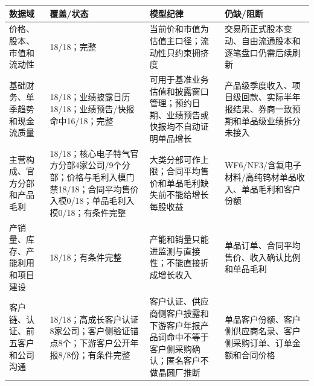 \begin{exhibitbox}
\scriptsize
\begin{tabularx}{\exhibitboxwidth}{L{2.1cm} L{1.8cm} X X}
\toprule
\textbf{数据域} & \textbf{覆盖/状态} & \textbf{模型纪律} & \textbf{仍缺/阻断} \\
\midrule
价格、股本、市值和流动性 & 18/18；完整 & 当前价和市值为估值主口径；流动性只约束拥挤度 & 交易所正式股本变动、自由流通股本和逐笔盘口仍需后续刷新 \\
基础财务、单季趋势和现金流质量 & 18/18；业绩披露日历18/18；业绩预告/快报命中16/18；完整 & 可用于基准业务估值和披露窗口管理；预约日期、业绩预告或快报均不自动证明单品增长 & 产品级季度收入、项目级回款、实际半年报结果、券商一致预期和单品级业绩拆分未接入 \\
主营构成、官方分部和产品毛利 & 18/18；核心电子特气官方分部4家公司/9个分部；价格与毛利入模门禁18/18；合同平均售价入模0/18；单品毛利入模0/18；有条件完整 & 大类分部可作上限；合同平均售价和单品毛利缺失前不能给增长每股收益 & WF6/NF3/含氟电子材料/高纯钨材单品收入、单品毛利和客户份额 \\
产销量、库存、产能利用和项目建设 & 18/18；有条件完整 & 产能和销量只能进监测与直接性；不能直接折成增长收入 & 单品订单、合同平均售价、收入确认比例和单品毛利 \\
客户链、认证、前五客户和公司沟通 & 18/18；高成长客户认证8家公司；客户侧验证锚点8个；下游客户公开年报8/8份；有条件完整 & 客户认证、供应商侧客户披露和下游客户年报产品词命中不等于客户侧采购确认；匿名客户不做晶圆厂推断 & 单品客户份额、客户侧供应商名录、客户侧采购订单、订单金额和合同价格 \\
\bottomrule
\end{tabularx}
\end{exhibitbox}

